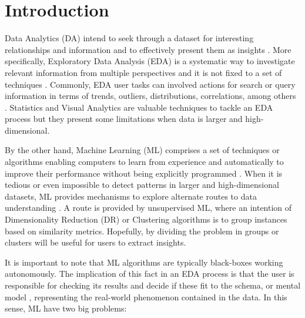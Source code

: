 
\chapter{Introduction}  %
\label{chapter1}

\graphicspath{{Chapter1/figs/}}

Data Analytics (DA) intend to seek through a dataset for interesting relationships and information and to effectively present them as insights \cite{TukeyJohnW.andWilk1966DataOverview}. More specifically, Exploratory Data Analysis (EDA) is a systematic way to investigate relevant information from multiple perspectives and it is not fixed to a set of techniques \cite{Yu2003ExploratoryAnalysis}. Commonly, EDA user tasks can involved actions for search or query information in terms of trends, outliers, distributions, correlations, among others \cite{Munzner2014VisualizationDesign}. Statistics and Visual Analytics are valuable techniques to tackle an EDA process but they present some limitations when data is larger and high-dimensional.

By the other hand, Machine Learning (ML) comprises a set of techniques or algorithms enabling computers to learn from experience and automatically to improve their performance \cite{Michie1968MemoLearning} without being explicitly programmed \cite{Koza1996}. When it is tedious or even impossible to detect patterns in larger and high-dimensional datasets, ML provides mechanisms to explore alternate routes to data understanding \cite{Yu2003ExploratoryAnalysis}. A route is provided by unsupervised ML, where an intention of Dimensionality Reduction (DR) or Clustering algorithms is to group instances based on similarity metrics. Hopefully, by dividing the problem in groups or clusters will be useful for users to extract insights.

It is important to note that ML algorithms are typically black-boxes working autonomously. The implication of this fact in an EDA process is that the user is responsible for checking its results and decide if these fit to the schema, or mental model \cite{Grolemund2014AAnalysis}, representing the real-world phenomenon contained in the data. In this sense, ML have two big problems: 

